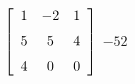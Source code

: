 {$\left[ \begin {array}{ccc} 1&-2&1\\\noalign{\medskip}5&5&4
\\\noalign{\medskip}4&0&0\end {array} \right]$} 
{$-52$}

  

 

